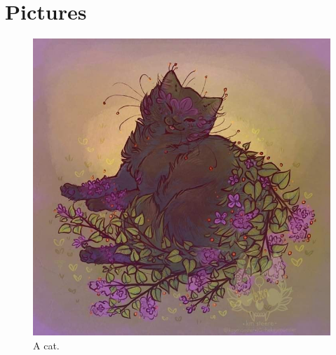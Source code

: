 \documentclass{article}
\begin{document}
\section{Pictures}

\begin{figure}[H] %
  \includegraphics[width=\linewidth]{cat.jpg}
  \caption{A cat.}
  \label{fig:cat}
\end{figure}
\end{document}
